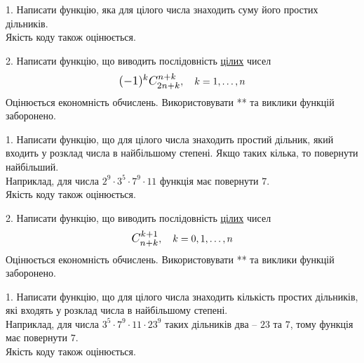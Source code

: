 \documentclass[12pt, ukrainian]{article}
\begin{document}
\begin{Large}
\newpage




1. Написати функцію, яка для цілого числа знаходить суму його простих дільників.\\	Якість коду також оцінюється. 



\vspace{10mm}

\newpage

2. 
Написати функцію, що виводить послідовність \underline{цілих} чисел
$$\scalebox{1.2}{$(-1)^{k}C_{2n+k}^{n+k}$}, \quad k=1,\ldots,n$$
Оцінюється економність обчислень. Використовувати ** та виклики функцій заборонено.

\newpage




1. Написати функцію, що для цілого числа знаходить простий дільник, який входить у розклад числа в найбільшому степені. Якщо таких кілька, то повернути найбільший. \\ Наприклад, для числа $2^{9}{\cdot}3^5{\cdot}7^9{\cdot}11$ функція має повернути $7$.\\	Якість коду також оцінюється. 



\vspace{10mm}

\newpage

2. 
Написати функцію, що виводить послідовність \underline{цілих} чисел
$$\scalebox{1.2}{$C_{n+k}^{k+1}$}, \quad k=0,1,\ldots,n$$
Оцінюється економність обчислень. Використовувати ** та виклики функцій заборонено.

\newpage




1. Написати функцію, що для цілого числа знаходить кількість простих дільників, які входять у розклад числа в найбільшому степені. \\ Наприклад, для числа $3^5{\cdot}7^9{\cdot}11{\cdot}23^{9}$ таких дільників два – $23$ та $7$, тому функція має повернути $7$.\\	Якість коду також оцінюється. 



\vspace{10mm}

\newpage


\end{Large}
\end{document}
